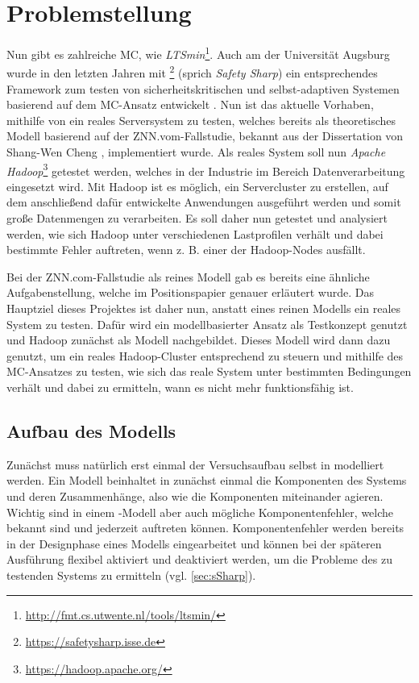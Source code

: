 \section{Problemstellung}\label{sec:problemstellung}

Nun gibt es zahlreiche MC, wie \zB \emph{LTSmin}\footnote{\url{http://fmt.cs.utwente.nl/tools/ltsmin/}}. Auch am \isse der Universität Augsburg wurde in den letzten Jahren mit \sS\footnote{\url{https://safetysharp.isse.de}} (sprich \emph{Safety Sharp}) ein entsprechendes Framework zum testen von sicherheitskritischen und selbst-adaptiven Systemen basierend auf dem MC-Ansatz entwickelt \cite{Habermaier2015,Habermaier2016}. Nun ist das aktuelle Vorhaben, mithilfe von \sS ein reales Serversystem zu testen, welches bereits als theoretisches Modell basierend auf der ZNN.vom-Fallstudie, bekannt aus der Dissertation von Shang-Wen Cheng \cite{Cheng2008}, implementiert wurde. Als reales System soll nun \emph{Apache Hadoop}\footnote{\url{https://hadoop.apache.org/}} getestet werden, welches in der Industrie im Bereich Datenverarbeitung eingesetzt wird. Mit Hadoop ist es möglich, ein Servercluster zu erstellen, auf dem anschließend dafür entwickelte Anwendungen ausgeführt werden und somit große Datenmengen zu verarbeiten. Es soll daher nun getestet und analysiert werden, wie sich Hadoop unter verschiedenen Lastprofilen verhält und dabei bestimmte Fehler auftreten, wenn z. B. einer der Hadoop-Nodes ausfällt.

Bei der ZNN.com-Fallstudie als reines Modell gab es bereits eine ähnliche Aufgabenstellung, welche im Positionspapier \cite{Eberhardinger2017} genauer erläutert wurde. Das Hauptziel dieses Projektes ist daher nun, anstatt eines reinen Modells ein reales System zu testen. Dafür wird ein modellbasierter Ansatz als Testkonzept genutzt und Hadoop zunächst als Modell nachgebildet. Dieses Modell wird dann dazu genutzt, um ein reales Hadoop-Cluster entsprechend zu steuern und mithilfe des MC-Ansatzes zu testen, wie sich das reale System unter bestimmten Bedingungen verhält und dabei zu ermitteln, wann es nicht mehr funktionsfähig ist.

\subsection{Aufbau des Modells}\label{sec:modellaufbau}

Zunächst muss natürlich erst einmal der Versuchsaufbau selbst in \sS modelliert werden. Ein Modell beinhaltet in \sS zunächst einmal die Komponenten des Systems und deren Zusammenhänge, also wie die Komponenten miteinander agieren. Wichtig sind in einem \sS-Modell aber auch mögliche Komponentenfehler, welche bekannt sind und jederzeit auftreten können. Komponentenfehler werden bereits in der Designphase eines Modells eingearbeitet und können bei der späteren Ausführung flexibel aktiviert und deaktiviert werden, um die Probleme des zu testenden Systems zu ermitteln (vgl. \autoref{sec:sSharp}).


